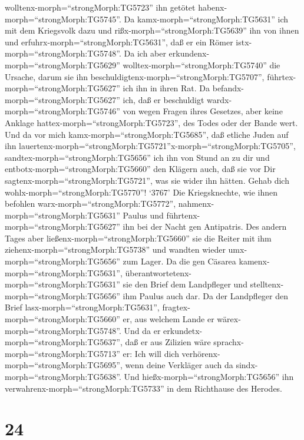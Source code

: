wolltenx-morph=``strongMorph:TG5723'' ihn getötet
habenx-morph=``strongMorph:TG5745''. Da
kamx-morph=``strongMorph:TG5631'' ich mit dem Kriegsvolk dazu und
rißx-morph=``strongMorph:TG5639'' ihn von ihnen und
erfuhrx-morph=``strongMorph:TG5631'', daß er ein Römer
istx-morph=``strongMorph:TG5748''.  Da ich aber
erkundenx-morph=``strongMorph:TG5629''
wolltex-morph=``strongMorph:TG5740'' die Ursache, darum sie ihn
beschuldigtenx-morph=``strongMorph:TG5707'',
führtex-morph=``strongMorph:TG5627'' ich ihn in ihren Rat. 
Da befandx-morph=``strongMorph:TG5627'' ich, daß er beschuldigt
wardx-morph=``strongMorph:TG5746'' von wegen Fragen ihres Gesetzes, aber
keine Anklage hattex-morph=``strongMorph:TG5723'', des Todes oder der
Bande wert.  Und da vor mich
kamx-morph=``strongMorph:TG5685'', daß etliche Juden auf ihn
lauertenx-morph=``strongMorph:TG5721''x-morph=``strongMorph:TG5705'',
sandtex-morph=``strongMorph:TG5656'' ich ihn von Stund an zu dir und
entbotx-morph=``strongMorph:TG5660'' den Klägern auch, daß sie vor Dir
sagtenx-morph=``strongMorph:TG5721'', was sie wider ihn hätten. Gehab
dich wohlx-morph=``strongMorph:TG5770''!  `3767' Die
Kriegsknechte, wie ihnen befohlen warx-morph=``strongMorph:TG5772'',
nahmenx-morph=``strongMorph:TG5631'' Paulus und
führtenx-morph=``strongMorph:TG5627'' ihn bei der Nacht gen Antipatris.
 Des andern Tages aber ließenx-morph=``strongMorph:TG5660''
sie die Reiter mit ihm ziehenx-morph=``strongMorph:TG5738'' und wandten
wieder umx-morph=``strongMorph:TG5656'' zum Lager.  Da die
gen Cäsarea kamenx-morph=``strongMorph:TG5631'',
überantwortetenx-morph=``strongMorph:TG5631'' sie den Brief dem
Landpfleger und stelltenx-morph=``strongMorph:TG5656'' ihm Paulus auch
dar.  Da der Landpfleger den Brief
lasx-morph=``strongMorph:TG5631'', fragtex-morph=``strongMorph:TG5660''
er, aus welchem Lande er wärex-morph=``strongMorph:TG5748''. Und da er
erkundetx-morph=``strongMorph:TG5637'', daß er aus Zilizien wäre
sprachx-morph=``strongMorph:TG5713'' er:  Ich will dich
verhörenx-morph=``strongMorph:TG5695'', wenn deine Verkläger auch da
sindx-morph=``strongMorph:TG5638''. Und
hießx-morph=``strongMorph:TG5656'' ihn
verwahrenx-morph=``strongMorph:TG5733'' in dem Richthause des Herodes.

\hypertarget{section-23}{%
\section{24}\label{section-23}}

